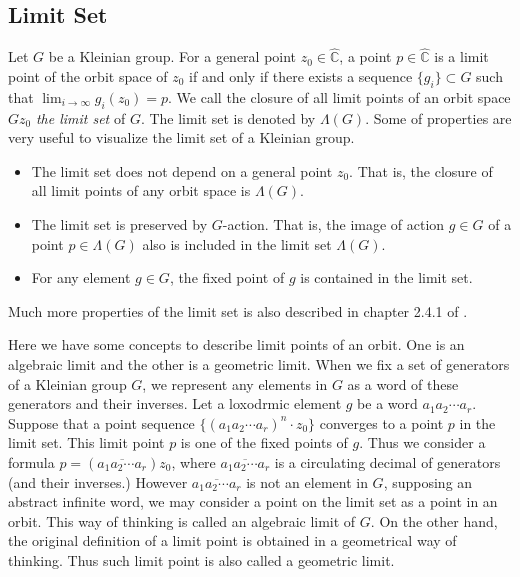 \subsection{Limit Set}

Let $G$ be a Kleinian group.
For a general point $z_0 \in \hat{\mathbb{C}}$,
a point $p  \in \hat{\mathbb{C}}$ is a limit point 
of the orbit space of $z_0$ if and only if 
there exists a sequence $\{ g_i \} \subset G$ such that 
$\displaystyle \lim_{i\to\infty} g_i(z_0) = p$.
We call the closure of all limit points of an orbit space $Gz_0$ \textit{the limit set} of $G$.
The limit set is denoted by $\Lambda(G)$.
Some of properties are very useful to visualize the limit set of a Kleinian group.
\begin{itemize}
\item The limit set does not depend on a general point $z_0$.  
That is, the closure of all limit points of any orbit space is $\Lambda(G)$.
\item The limit set is preserved by $G$-action.  That is,
the image of action $g\in G$ of a point $p\in \Lambda(G)$  
      also is included in the limit set $\Lambda(G)$.
\item For any element $g \in G$, the fixed point of $g$ is contained in the limit set.
\end{itemize}
Much more properties of the limit set is also described in chapter 2.4.1 of
\cite{marden_2016}.

Here we have some concepts to describe limit points of an orbit. 
One is an algebraic limit and the other is a geometric limit.
When we fix a set of generators of a Kleinian group $G$, we represent any elements in $G$ 
as a word of these generators and their inverses.
Let a loxodrmic element $g$ be a word $a_1a_2\cdots a_r$.
Suppose that a point sequence $\{ (a_1a_2\cdots a_r)^n\cdot z_0 \}$ converges to a point $p$ in the limit set.
This limit point $p$ is one of the fixed points of $g$.
Thus we consider a formula $p = (\overline{a_1a_2\cdots a_r})z_0$, where $\overline{a_1a_2\cdots a_r}$
is a circulating decimal of generators (and their inverses.)
However $\overline{a_1a_2\cdots a_r}$ is not an element in $G$, supposing an abstract infinite word,
we may consider a point on the limit set as a point in an orbit.
This way of thinking is called an algebraic limit of $G$.
On the other hand, the original definition of a limit point is obtained in a geometrical way of thinking.
Thus such limit point is also called a geometric limit.
